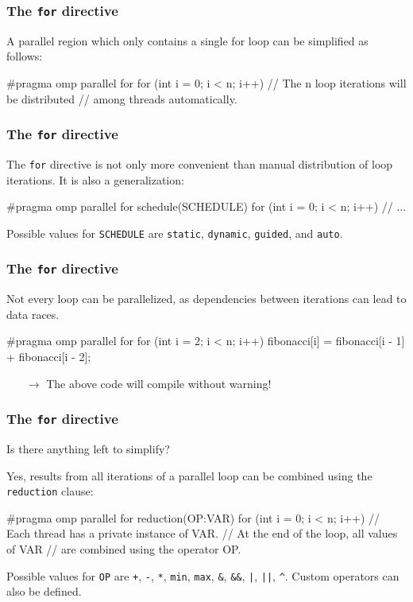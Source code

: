 \documentclass[12pt,t]{beamer}
\let\emph\relax %
\newcommand{\conclude}[1]{%
  \begin{itemize}
    \item[$\rightarrow$]#1
  \end{itemize}
}
\begin{document}
  \begin{frame}[fragile]
    \frametitle{The \texttt{for} directive}

    A parallel region which only contains a single for loop can be simplified as follows:

    \begin{code}
#pragma omp parallel for
for (int i = 0; i < n; i++) {
  // The n loop iterations will be distributed
  // among threads automatically.
}
    \end{code}
  \end{frame}

  \begin{frame}[fragile]
    \frametitle{The \texttt{for} directive}

    The \texttt{for} directive is not only more convenient than manual distribution of loop iterations. It is also a generalization:

    \begin{code}
#pragma omp parallel for schedule(SCHEDULE)
for (int i = 0; i < n; i++) {
  // ...
}
    \end{code}
    Possible values for \texttt{SCHEDULE} are \texttt{static}, \texttt{dynamic}, \texttt{guided}, and \texttt{auto}.
  \end{frame}

  \begin{frame}[fragile]
    \frametitle{The \texttt{for} directive}

    \emph{Caution:} Not every loop can be parallelized, as dependencies between iterations can lead to data races.

    \begin{code}
#pragma omp parallel for
for (int i = 2; i < n; i++) {
  fibonacci[i] = fibonacci[i - 1]
               + fibonacci[i - 2]; 
}
    \end{code}
    \conclude{The above code will compile without warning!}
  \end{frame}

  \begin{frame}[fragile]
    \frametitle{The \texttt{for} directive}

    Is there anything left to simplify?

    Yes, results from all iterations of a parallel loop can be combined using the \texttt{reduction} clause:
    \begin{code}
#pragma omp parallel for reduction(OP:VAR)
for (int i =  0; i < n; i++) {
  // Each thread has a private instance of VAR.
  // At the end of the loop, all values of VAR
  // are combined using the operator OP.
}
    \end{code}
    Possible values for \texttt{OP} are \texttt{+}, \texttt{-}, \texttt{*}, \texttt{min}, \texttt{max}, \texttt{\&}, \texttt{\&\&}, \texttt{|}, \texttt{||}, \texttt{\^}.
    Custom operators can also be defined.
  \end{frame}
\end{document}
